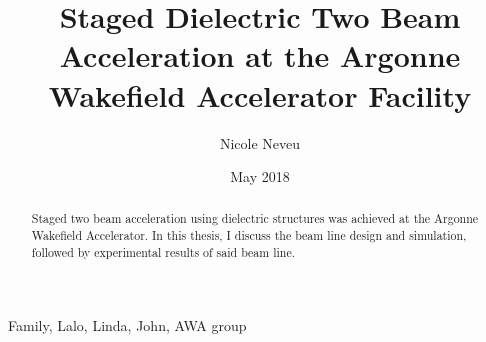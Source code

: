 \documentclass{iitthesis}
\begin{document}
\title{Staged Dielectric Two Beam Acceleration at the Argonne Wakefield Accelerator Facility}

\author{Nicole Neveu }
\date{May 2018}
\copyrightnoticetrue      %
\maketitle                %


\prelimpages         %

\begin{acknowledgement}     %
	\par  Family, Lalo, Linda, John, AWA group
\end{acknowledgement}

\tableofcontents
\clearpage

\listoftables

\clearpage

\listoffigures

\clearpage


\listofsymbols
{}

\clearpage

\begin{abstract}           %
	\par Staged two beam acceleration using dielectric structures was achieved
	at the Argonne Wakefield Accelerator. In this thesis, I discuss the beam 
	line design and simulation, followed by experimental results of said
	beam line.  
\end{abstract}


\textpages     %


 \label{sec:int}
\end{document}
